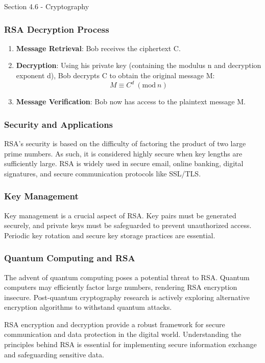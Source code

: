 \begin{notes}{Section 4.6 - Cryptography}
    \subsubsection*{RSA Decryption Process}

    \begin{enumerate}
        \item \textbf{Message Retrieval}: Bob receives the ciphertext C.
        \item \textbf{Decryption}: Using his private key (containing the modulus n and decryption exponent d), Bob decrypts C to obtain the original message M: \[M \equiv C^d \ (\text{mod} \ n)\]
        \item \textbf{Message Verification}: Bob now has access to the plaintext message M.
    \end{enumerate}
    
    \subsubsection*{Security and Applications}
    
    RSA's security is based on the difficulty of factoring the product of two large prime numbers. As such, it is considered highly secure when key lengths are sufficiently large. RSA is widely used 
    in secure email, online banking, digital signatures, and secure communication protocols like SSL/TLS.
    
    \subsubsection*{Key Management}
    
    Key management is a crucial aspect of RSA. Key pairs must be generated securely, and private keys must be safeguarded to prevent unauthorized access. Periodic key rotation and secure key storage 
    practices are essential.
    
    \subsubsection*{Quantum Computing and RSA}
    
    The advent of quantum computing poses a potential threat to RSA. Quantum computers may efficiently factor large numbers, rendering RSA encryption insecure. Post-quantum cryptography research is 
    actively exploring alternative encryption algorithms to withstand quantum attacks.
    
    RSA encryption and decryption provide a robust framework for secure communication and data protection in the digital world. Understanding the principles behind RSA is essential for implementing 
    secure information exchange and safeguarding sensitive data.
\end{notes}